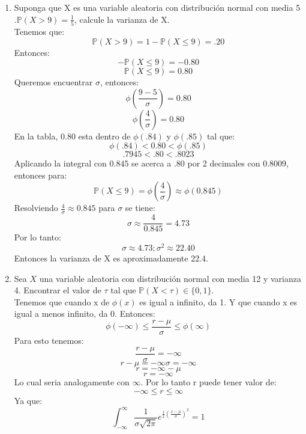 \documentclass[11pt,a4paper]{report}
\begin{document}
\begin{enumerate}
{\begin{enumerate}
{                    \[ \mathbb{P}(4 < x < 10) = \mathbb{P}(\frac{4-10}{6} < z < \frac{10-10}{6}) =\mathbb{P}(-1 < z < 0) =  F_z(0) - (1 - F_z(1))\]
                    \[= 0.5 - 1 + 0.8413 = 0.3413 \]

                    \[ \mathbb{P}(X < 8) = \mathbb{P}(z < \frac{8-10}{6}) = F_z(-\frac{1}{3}) = 1 - F_z(0.33) = 1 - 0.6293 = 0.3707 \]

                     \[ \mathbb{P}(X < 20) = \mathbb{P}(z < \frac{20-10}{6}) = F_z(\frac{10}{6}) = F_z(1.66) = 0.9515 \]

                     \[ \mathbb{P}(X > 16) = 1 - \mathbb{P}(z \leq \frac{16-10}{6}) = 1 -  F_z(1) =  1 - 0.8413 = 0.1587 \]
				}

				\item {
				Suponga que X es una variable aleatoria con distribución normal con media 5 .$\mathbb{P} (X > 9) = \frac{1}{5}$, calcule la varianza de X.\\

				Tenemos que:
				\[\mathbb{P}(X > 9) = 1 - \mathbb{P}(X \leq 9) = .20\]
				Entonces:
				\[- \mathbb{P}(X \leq 9) = - 0.80\]
				\[\mathbb{P}(X \leq 9) = 0.80 \]
				Queremos encuentrar $\sigma$, entonces:
				\[\phi(\frac{9 - 5}{\sigma}) = 0.80 \]
				\[\phi(\frac{4}{\sigma}) = 0.80\]
				En la tabla, $0.80$ esta dentro de $\phi(.84)$ y $\phi(.85)$ tal que:
				\[\phi(.84) < 0.80 < \phi(.85) \]
				\[.7945 < .80 < .8023\]
				Aplicando la integral con $0.845$ se acerca a .80 por 2 decimales con 0.8009, entonces para:
				\[\mathbb{P}(X \leq 9) = \phi(\frac{4}{\sigma}) \approx \phi(0.845)\]
				Resolviendo $\frac{4}{\sigma} \approx 0.845$ para $\sigma$ se tiene:
				\[ \sigma \approx \frac{4}{0.845} = 4.73\]
				Por lo tanto:
				\[ \sigma \approx 4.73 ; \sigma^2 \approx 22.40 \]
				Entonces la varianza de X es aproximadamente 22.4.
				}

				\item {
					Sea $X$ una variable aleatoria con distribución normal con
					media 12 y varianza 4. Encontrar el valor de $\tau$ tal que
					$\mathbb{P}(X < \tau) \in \{0,1\}$.\\
					Tenemos que cuando x de $\phi(x)$ es igual a infinito, da 1. Y que cuando x es igual a menos infinito, da 0. Entonces:
					\[\phi(-\infty) \leq \frac{r-\mu}{\sigma} \leq \phi(\infty)\]
					Para esto tenemos:
					\[\frac{r-\mu}{\sigma} = -\infty\]
					\[ r - \mu = -\infty \sigma = -\infty\]
					\[r = -\infty - \mu \]
					\[r = -\infty\]
					Lo cual seria analogamente con $\infty$. Por lo tanto r puede tener valor de:
					\[ -\infty \leq r \leq \infty \]
					Ya que:
					\[\int^{\infty}_{-\infty}\frac{1}{\sigma\sqrt{2\pi}}e^{\frac{1}{2}(\frac{x-\mu}{\sigma})^2} = 1\]
				}


\end{enumerate}}
\end{enumerate}
\end{document}
